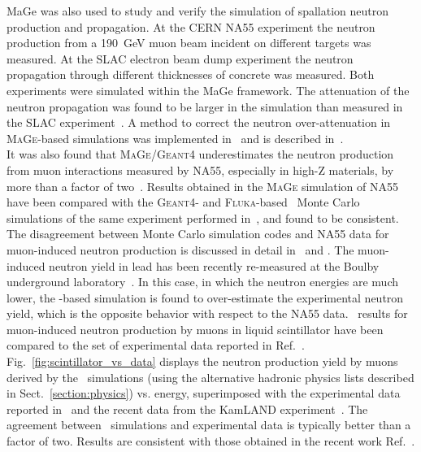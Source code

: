 \documentclass[article]{IEEEtran}
\begin{document}
{\sc MaGe} was also used to study and verify the
simulation of spallation neutron production and propagation. At the
CERN NA55 experiment the neutron production from a 190~GeV muon beam
incident on different targets was measured. At the SLAC electron beam
dump experiment the neutron propagation through different thicknesses of concrete was
measured. Both experiments were simulated within the {\sc MaGe}
framework. The attenuation of the neutron propagation was found to be larger in the simulation 
than measured in the SLAC experiment~\cite{mike_neutron}. A method to correct the neutron 
over-attenuation in \textsc{MaGe}-based simulations was implemented in \MaGe\ and is described 
in~\cite{mike_neutron}. \\

It was also found that \textsc{MaGe}/\textsc{Geant4} underestimates 
the neutron production from muon interactions measured by NA55, especially 
in high-Z materials, by more than a factor of two~\cite{mike_neutron}. 
Results obtained in the \textsc{MaGe} simulation of NA55 have been 
compared with the \textsc{Geant4}- and \textsc{Fluka}-based~\cite{fluka} 
Monte Carlo simulations of the same experiment performed in~\cite{Araujo:05}, and 
found to be consistent.
The disagreement between Monte Carlo simulation codes and NA55 data for muon-induced 
neutron production is discussed in detail in~\cite{Araujo:05} and \cite{ilias06}.
The muon-induced neutron yield in lead has been recently 
re-measured at the Boulby underground laboratory~\cite{Araujo:08}. In this case,
in which the neutron energies are much lower, the 
\GF-based simulation is found to over-estimate the experimental neutron yield, 
which is the opposite behavior with respect to the NA55 data.
\MaGe\ results for muon-induced neutron production by muons in liquid scintillator 
have been compared to the set of experimental data reported in Ref.~\cite{Araujo:05}. 
Fig.~\ref{fig:scintillator_vs_data} displays the neutron production yield by muons derived 
by the \MaGe\ simulations 
(using the alternative hadronic physics lists described in Sect.~\ref{section:physics}) 
vs. energy, superimposed with the experimental data~\cite{mudata} reported in~\cite{Araujo:05} 
and the recent data from the KamLAND experiment~\cite{kamlanddata}. 
The agreement between \MaGe\ simulations and experimental data is typically 
better than a factor of two. Results are consistent with those obtained in the 
recent work Ref.~\cite{Lindote:09}. \\
\end{document}
